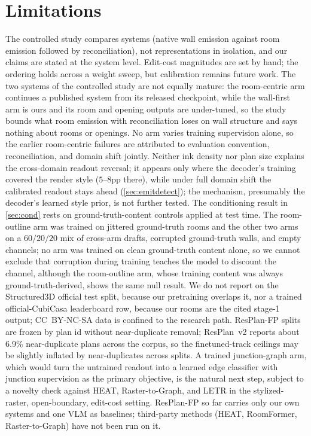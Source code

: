 \documentclass{article}
\begin{document}
\section{Limitations}\label{sec:limits}
The controlled study compares systems (native wall emission against room
emission followed by reconciliation), not representations in isolation, and
our claims are stated at the system level. Edit-cost magnitudes are set by
hand; the ordering holds across a weight sweep, but calibration remains
future work. The two systems of the controlled study are not equally mature: the
room-centric arm continues a published system from its released checkpoint,
while the wall-first arm is ours and its room and opening outputs are
under-tuned, so the study bounds what room emission with reconciliation loses
on wall structure and says nothing about rooms or openings. No arm varies
training supervision alone, so the earlier room-centric failures are
attributed to evaluation convention, reconciliation, and domain shift jointly.
Neither ink density nor plan size explains the cross-domain readout
reversal; it appears only where the decoder's training covered the render
style ($5$--$8$pp there), while under full domain shift the calibrated
readout stays ahead (\cref{sec:emitdetect}); the mechanism, presumably the
decoder's learned style prior, is not further tested. The conditioning
result in \cref{sec:cond} rests on ground-truth-content controls applied at test
time. The room-outline arm was trained on jittered ground-truth rooms and the
other two arms on a $60/20/20$ mix of cross-arm drafts, corrupted ground-truth
walls, and empty channels; no arm was trained on clean ground-truth content
alone, so we cannot exclude that corruption during training teaches the model
to discount the channel, although the room-outline arm, whose training content
was always ground-truth-derived, shows the same null result. We do not
report on the Structured3D official test split, because our pretraining overlaps
it, nor a trained official-CubiCasa leaderboard row, because our rooms are the
cited stage-1 output; CC~BY-NC-SA data is confined to the research path.
ResPlan-FP splits are frozen by plan id without near-duplicate removal;
ResPlan~v2 reports about 6.9\% near-duplicate plans across the corpus, so the
finetuned-track ceilings may be slightly inflated by near-duplicates across
splits. A trained junction-graph arm, which would turn the untrained readout
into a learned edge classifier with junction supervision as the primary
objective, is the natural next step, subject to a novelty check against HEAT,
Raster-to-Graph, and LETR in the stylized-raster, open-boundary, edit-cost
setting. ResPlan-FP so far carries only our own systems and one VLM as
baselines; third-party methods (HEAT, RoomFormer, Raster-to-Graph) have not
been run on it.
\end{document}
